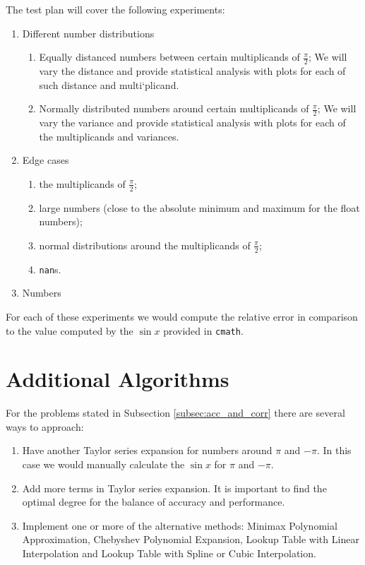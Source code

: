 \documentclass[12pt]{article}
\begin{document}
The test plan will cover the following experiments:
\begin{enumerate}
    \item Different number distributions
    \begin{enumerate}
        \item Equally distanced numbers between certain multiplicands of $\frac{\pi}{2}$; We will vary the distance and provide statistical analysis with plots for each of such distance and multi`plicand.
        \item Normally distributed numbers around certain multiplicands of $\frac{\pi}{2}$; We will vary the variance and provide statistical analysis with plots for each of the multiplicands and variances.
    \end{enumerate}
    \item Edge cases
        \begin{enumerate}
            \item the multiplicands of $\frac{\pi}{2}$;
            \item large numbers (close to the absolute minimum  and maximum for the float numbers);
            \item normal distributions around the multiplicands of $\frac{\pi}{2}$;
            \item \texttt{nan}s.
        \end{enumerate}
    \item Numbers
\end{enumerate}
For each of these experiments we would compute the relative error in comparison to the value computed by the $\sin x$ provided in \texttt{cmath}.

\section{Additional Algorithms}
For the problems stated in Subsection \ref{subsec:acc_and_corr} there are several ways to approach:
\begin{enumerate}
    \item Have another Taylor series expansion for numbers around $\pi$ and $-\pi$. In this case we would manually calculate the $\sin x$ for $\pi$ and $-\pi$.
    \item  Add more terms in Taylor series expansion. It is important to find the optimal degree for the balance of accuracy and performance.
    \item Implement one or more of the alternative methods: Minimax Polynomial Approximation, Chebyshev Polynomial Expansion, Lookup Table with Linear Interpolation and Lookup Table with Spline or Cubic Interpolation.
\end{enumerate}


\end{document}
